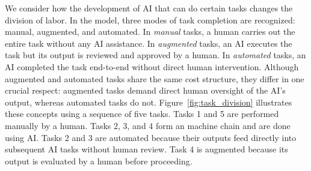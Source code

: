 \documentclass{article}
\theoremstyle{plain}
\theoremstyle{plain}
\begin{document}
We consider how the development of AI that can do certain tasks changes the division of labor.  
In the model, three modes of task completion are recognized: manual, augmented, and automated.  
In \emph{manual} tasks, a human carries out the entire task without any AI assistance.  
In \emph{augmented} tasks, an AI executes the task but its output is reviewed and approved by a human.
In \emph{automated} tasks, an AI completed the task end-to-end without direct human intervention.
Although augmented and automated tasks share the same cost structure, they differ in one crucial respect: augmented tasks demand direct human oversight of the AI’s output, whereas automated tasks do not.
Figure~\ref{fig:task_division} illustrates these concepts using a sequence of five tasks.  
Tasks 1 and 5 are performed manually by a human.  
Tasks 2, 3, and 4 form an machine chain and are done using AI.
Tasks 2 and 3 are automated because their outputs feed directly into subsequent AI tasks without human review.
Task 4 is augmented because its output is evaluated by a human before proceeding. 
\end{document}
